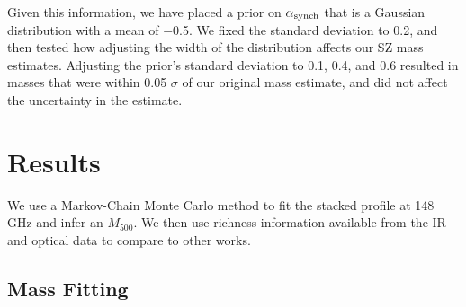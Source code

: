 \documentclass[a4paper,fleqn,usenatbib]{mnras}
\begin{document}
Given this information, we have placed a prior on $\alpha_{\rm synch}$ that is a Gaussian distribution with a mean of $-$0.5. 
We fixed the standard deviation to 0.2, and then tested how adjusting the width of the distribution affects our SZ mass estimates.
Adjusting the prior's standard deviation to 0.1, 0.4, and 0.6 resulted in masses that were within 0.05 $\sigma$ of our original mass estimate, and did not affect the uncertainty in the estimate.



\section{Results} \label{sec:results}

We use a Markov-Chain Monte Carlo method to fit the stacked profile at 148 GHz and infer an $M_{500}$. We then use richness information available from the IR and optical data to compare to other works.




\subsection{Mass Fitting}
\end{document}
